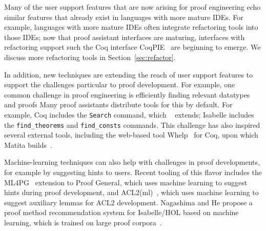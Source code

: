Many of the user support features that are now arising for proof engineering
echo similar features that already exist in languages with more mature IDEs. 
%
%
%
%
%
For example, languages with more mature IDEs often integrate refactoring tools into those IDEs;
now that proof assistant interfaces are maturing, interfaces
with refactoring support such %
the Coq interface CoqPIE~\citep{Roe2016} are beginning to emerge.
We discuss more refactoring tools in Section~\ref{sec:refactor}.

In addition, new techniques are extending the reach of user support features to
support the challenges particular to proof development. 
For example, one common challenge in proof engineering is efficiently finding relevant datatypes and proofs
Many proof assistants distribute tools for this by default.
For example, Coq includes the \lstinline{Search} command,
which \ssreflect~\citep{Gonthier2010} extends;
Isabelle includes the \lstinline{find_theorems} and \lstinline{find_consts} commands.
This challenge has also inspired several external tools, including the web-based tool Whelp~\citep{asperti2004content} for Coq,
upon which Matita builds~\citep{asperti2007user}.

Machine-learning techniques can also help with challenges in proof developments, for example by suggesting hints to users.
Recent tooling of this flavor includes the ML4PG~\citep{Komendantskaya2012} extension to Proof General, which
uses machine learning to suggest hints during proof development,
and ACL2(ml)~\citep{Heras2013}, which uses machine learning to suggest auxiliary lemmas
for ACL2 development. Nagashima and He propose a proof method recommendation system for
Isabelle/HOL based on machine learning, which is trained on large proof corpora~\citep{Nagashima2018}.

